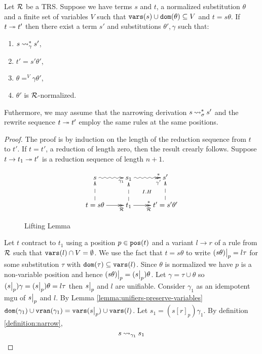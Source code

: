 \begin{lemma}\label{lemma:lifting-lemma-ordinary-narrowing}
	Let $\mathcal{R}$ be a TRS. Suppose we have terms $s$ and $t$, a normalized substitution $\theta$ and a finite set of variables $V$ such that $\mathtt{vars}(s) \cup \mathtt{dom}(\theta) \subseteq V$ and $t = s\theta$. If $t \twoheadrightarrow t'$ then there exist a term $s'$ and substitutions $\theta', \gamma$ such that:
	\begin{enumerate}
		\item $s \mathbin{\rightsquigarrow}^{*}_{\gamma} s'$,
		\item $t' = s'\theta'$,
		\item $\theta =^V \gamma\theta'$,
		\item $\theta'$ is $\mathcal{R}$-normalized.
	\end{enumerate}
	Futhermore, we may assume that the narrowing derivation $s \mathbin{\rightsquigarrow}^{*}_{\sigma} s'$ and the rewrite sequence $t \twoheadrightarrow t'$ employ the same rules at the same positions.

	\begin{proof}
		The proof is by induction on the length of the reduction sequence from $t$ to $t'$. If $t = t'$, a reduction of length zero, then the result crearly follows. Suppose $t \rightarrow t_1 \twoheadrightarrow t'$ is a reduction sequence of length $n+1$.

		\begin{figure}[h!]
			\begin{displaymath}
				\xymatrix{
                    s \ar@{~>}[r]_>>{\gamma_1} & s_1 \ar@{}[dr]|{I.H} \ar@{~>>}[r]_>>{\gamma'}^>>{*} & s' \\
                    t = s\theta \ar@{-->}[u] \ar@{->>}[r]_>>{\trs} & \ar@{-->}[u] t_1 \ar@{->>}[r]_>>{\trs}^>>{*} & t' = s'\theta' \ar@{-->}[u]
				}
			\end{displaymath}
			\caption{Lifting Lemma}
			\label{figure:lifting-lemma}
        \end{figure}

		Let $t$ contract to $t_1$ using a position $p \in \mathtt{pos}(t)$ and a variant $l \rightarrow r$ of a rule from $\mathcal{R}$ such that $\mathtt{vars}(l) \cap V = \emptyset$. We use the fact that $t = s\theta$ to write $\restr{(s\theta)}{p} = l \tau$ for some substitution $\tau$ with $\mathtt{dom}(\tau) \subseteq \mathtt{vars}(l)$. Since $\theta$ is normalized we have $p$ is a non-variable position and hence $\restr{(s\theta)}{p} = (\restr{s}{p})\theta$. Let $\gamma = \tau \cup \theta$ so $(\restr{s}{p})\gamma = (\restr{s}{p})\theta = l \tau$ then $\restr{s}{p}$ and $l$ are unifiable. Consider $\gamma_1$ as an idempotent mgu of $\restr{s}{p}$ and $l$. By Lemma \ref{lemma:unifiers-preserve-variables} $\dom{\gamma_1} \cup \vran{\gamma_1} = \vars{\restr{s}{p}} \cup \vars{l}$. Let $s_1 = (s[r]_p)\gamma_1$. By definition \ref{definition:narrow},
		\begin{equation}\label{lifting-lemma:eqn:s-narrows-s_1}
			s \mathbin{\rightsquigarrow}_{\gamma_1} s_1
		\end{equation}


\end{proof}
\end{lemma}
